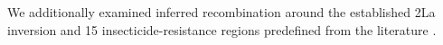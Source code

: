 We additionally examined inferred recombination around the established 2La inversion and 15 insecticide-resistance regions predefined from the literature \citep{ag1000g2017,ag1000g2020,lucas2023resistance,hancock2024surveillance}.
